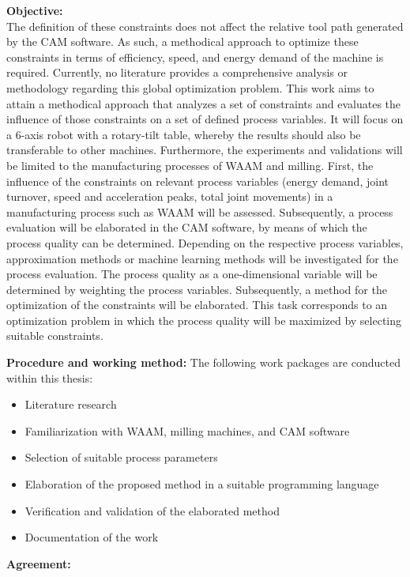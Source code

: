 \vspace{5mm}
\textbf{Objective:}\\
The definition of these constraints does not affect the relative tool path generated by the CAM software. As such, a methodical approach to optimize these constraints in terms of efficiency, speed, and energy demand of the machine is required. Currently, no literature provides a comprehensive analysis or methodology regarding this global optimization problem.
This work aims to attain a methodical approach that analyzes a set of constraints and evaluates the influence of those constraints on a set of defined process variables. It will focus on a 6-axis robot with a rotary-tilt table, whereby the results should also be transferable to other machines. Furthermore, the experiments and validations will be limited to the manufacturing processes of WAAM and milling. 
First, the influence of the constraints on relevant process variables (energy demand, joint turnover, speed and acceleration peaks, total joint movements) in a manufacturing process such as WAAM will be assessed. Subsequently, a process evaluation will be elaborated in the CAM software, by means of which the process quality can be determined. Depending on the respective process variables, approximation methods or machine learning methods will be investigated for the process evaluation. The process quality as a one-dimensional variable will be determined by weighting the process variables. Subsequently, a method for the optimization of the constraints will be elaborated. This task corresponds to an optimization problem in which the process quality will be maximized by selecting suitable constraints. 

\vspace{5mm}
\textbf{Procedure and working method:}
The following work packages are conducted within this thesis:

\begin{itemize}
\item Literature research
\item Familiarization with WAAM, milling machines, and CAM software
\item Selection of suitable process parameters
\item Elaboration of the proposed method in a suitable programming language
\item Verification and validation of the elaborated method
\item Documentation of the work

	 
\end{itemize}
\vspace{1.0cm}
\textbf{Agreement:}\\

